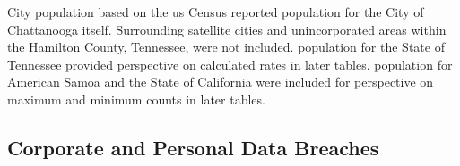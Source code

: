 \begin{table}[H]
\begin{tabular}
    \bottomrule \end{tabular}
\raggedright{City  \gls{population} based on the \gls{us} Census reported  \gls{population} for the City of Chattanooga itself.  Surrounding satellite cities and unincorporated areas within the Hamilton County, Tennessee, were not included.  \Gls{population} for the State of Tennessee provided perspective on calculated rates in later tables.  \Gls{population} for  American Samoa and the State of California were included for perspective on maximum and minimum counts in later tables.}
\end{table}


\subsection{Corporate and Personal Data Breaches}

